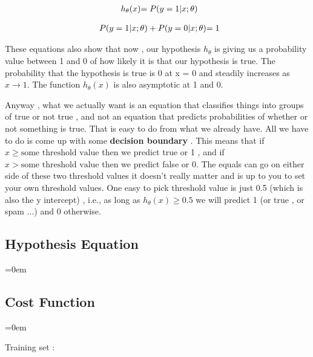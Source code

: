 \[
	\begin{array}{ l@{} l@{} }

	h_\theta(x) & = P(y=1|x;\theta)\\

	\end{array}
\]

\[
	\begin{array}{ l@{} l@{} }

	P(y=1|x;\theta) + P(y=0|x;\theta) & = 1 \\

	\end{array}
\]

These equations also show that now , our hypothesis $h_\theta$ is giving us a
probability value between 1 and 0 of how likely it is that our hypothesis is
true. The probability that the hypothesis is true is 0 at x = 0
and steadily increases as $x \rightarrow 1$. The function $h_\theta (x)$ is also
asymptotic at 1 and 0.

Anyway , what we actually want is an equation that classifies things into
groups of true or not true , and not an equation that predicts probabilities of
whether or not something is true. That is easy to do from what we already have.
All we have to do is come up with some \textbf{decision boundary} . This means
that if $x \geq \text{some threshold value}$ then we predict true or 1 , and if
$x > \text{some threshold value}$ then we predict false or 0. The equals can go
on either side of these two threshold values it doesn't really matter and is up
to you to set your own threshold values. One easy to pick threshold value is
just 0.5 (which is also the y intercept) , i.e., as long as $h_\theta (x) \geq
0.5 $ we will predict 1 (or true , or spam ...) and 0 otherwise.

\subsectionend
\subsection{Hypothesis Equation}
\label{ssec:hypothesis_equation}
\parindent=0em


\subsectionend
\subsection{Cost Function}
\label{ssec:cost_function}
\parindent=0em

Training set :

